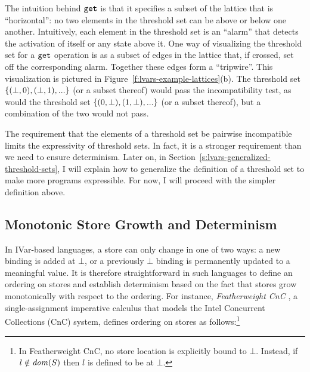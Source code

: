 \noindent The intuition behind $\mbox{\texttt{get}}$ is that
it specifies a subset of the lattice that is ``horizontal'': no two
elements in the threshold set can be above or below one another.
Intuitively, each element in the threshold set is an ``alarm'' that
detects the activation of itself or any state above it.  One way of
visualizing the threshold set for a $\mbox{\texttt{get}}$ operation is as a subset of
edges in the lattice that, if crossed, set off the corresponding
alarm.  Together these edges form a ``tripwire''.  This visualization
is pictured in Figure~\ref{f:lvars-example-lattices}(b).  The
threshold set $\lbrace (\bot, 0), (\bot, 1), ... \rbrace$ (or a subset
thereof) would pass the incompatibility test, as would the threshold
set $\lbrace (0, \bot), (1, \bot), ... \rbrace$ (or a subset thereof), but
a combination of the two would not pass.

The requirement that the elements of a threshold set be pairwise
incompatible limits the expressivity of threshold sets.  In fact, it
is a stronger requirement than we need to ensure determinism.  Later
on, in Section~\ref{s:lvars-generalized-threshold-sets}, I will
explain how to generalize the definition of a threshold set to make
more programs expressible.  For now, I will proceed with the simpler
definition above.

\subsection{Monotonic Store Growth and Determinism}\label{subsection:monotonicity}

In IVar-based languages, a store can only change in one of two ways: a
new binding is added at $\bot$, or a previously $\bot$ binding is
permanently updated to a meaningful value.  It is therefore
straightforward in such languages to define an ordering on stores and
establish determinism based on the fact that stores grow monotonically
with respect to the ordering. For instance, \emph{Featherweight
CnC} \cite{CnC}, a single-assignment imperative calculus that models
the Intel Concurrent Collections (CnC) system, defines ordering on
stores as follows:\footnote{In Featherweight CnC, no store location is
explicitly bound to $\bot$.  Instead, if $l \notin \mathit{dom}(S)$ then $l$
is defined to be at $\bot$.}

\DefLeqStoreCnC

